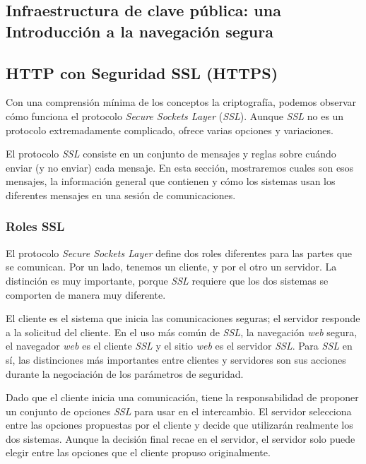 \subsection{Infraestructura de clave pública: una Introducción a la navegación segura}   



\subsection{HTTP con Seguridad SSL (HTTPS)} 

Con una comprensión mínima de los conceptos la criptografía, podemos 
observar cómo funciona el protocolo \emph{Secure Sockets Layer} (\emph{SSL}). Aunque
 \emph{SSL} no es un protocolo extremadamente complicado, ofrece varias 
 opciones y variaciones.

El protocolo \emph{SSL} consiste en un conjunto de mensajes y reglas sobre
 cuándo enviar (y no enviar) cada mensaje. En esta sección, mostraremos 
 cuales son esos mensajes, la información general que contienen y 
 cómo los sistemas usan los diferentes mensajes en una sesión de
  comunicaciones.


\subsubsection*{Roles SSL}
El protocolo \emph{Secure Sockets Layer} define dos roles diferentes para las
partes que se comunican. Por un lado, tenemos un cliente, y por el otro
un servidor. La distinción es muy importante, porque \emph{SSL} requiere que 
los dos sistemas se comporten de manera muy diferente. 

El cliente es el sistema que inicia las comunicaciones seguras; el 
servidor responde a la solicitud del cliente. En el uso más común 
de \emph{SSL}, la navegación \emph{web} segura, el navegador \emph{web} es el cliente \emph{SSL} 
y el sitio \emph{web} es el servidor \emph{SSL}. Para \emph{SSL} en sí, las distinciones 
más importantes entre clientes y servidores son sus acciones durante 
la negociación de los parámetros de seguridad.

Dado que el cliente inicia una comunicación, tiene la responsabilidad 
de proponer un conjunto de opciones \emph{SSL} para usar en el intercambio. 
El servidor selecciona entre las opciones propuestas por el cliente 
y decide que utilizarán realmente los dos sistemas. Aunque la decisión 
final recae en el servidor, el servidor solo puede elegir entre las 
opciones que el cliente propuso originalmente.


